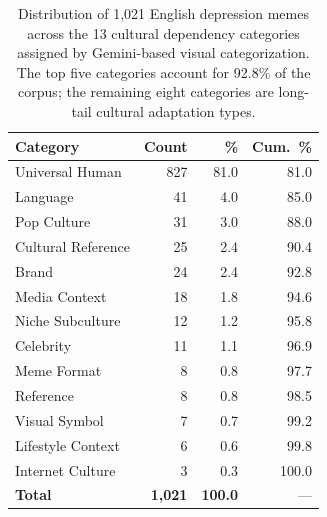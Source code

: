 
\begin{table}[t]
  \centering
  \small
  \begin{tabular}{lrrr}
    \toprule
    \textbf{Category} & \textbf{Count} & \textbf{\%} & \textbf{Cum.\ \%} \\
    \midrule
    Universal Human            & 827 & 81.0 & 81.0 \\
    Language                   &  41 &  4.0 & 85.0 \\
    Pop Culture                &  31 &  3.0 & 88.0 \\
    Cultural Reference         &  25 &  2.4 & 90.4 \\
    Brand                      &  24 &  2.4 & 92.8 \\
    Media Context              &  18 &  1.8 & 94.6 \\
    Niche Subculture           &  12 &  1.2 & 95.8 \\
    Celebrity                  &  11 &  1.1 & 96.9 \\
    Meme Format                &   8 &  0.8 & 97.7 \\
    Reference                  &   8 &  0.8 & 98.5 \\
    Visual Symbol              &   7 &  0.7 & 99.2 \\
    Lifestyle Context          &   6 &  0.6 & 99.8 \\
    Internet Culture           &   3 &  0.3 &100.0 \\
    \midrule
    \textbf{Total}             & \textbf{1,021} & \textbf{100.0} & --- \\
    \bottomrule
  \end{tabular}
  \caption{Distribution of 1,021 English depression memes across the 13 cultural dependency categories assigned by Gemini-based visual categorization. The top five categories account for 92.8\% of the corpus; the remaining eight categories are long-tail cultural adaptation types.}
  \label{tab:category-distribution}
\end{table}
